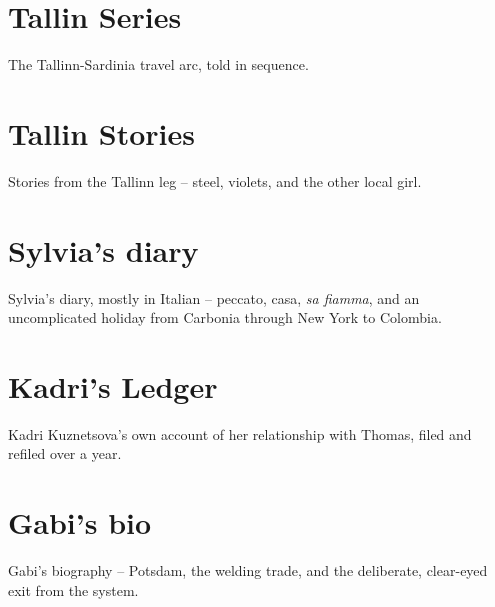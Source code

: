 \documentclass[a4paper]{memoir}
\begin{document}
\chapter{Tallin Series}
The Tallinn-Sardinia travel arc, told in sequence.


\chapter{Tallin Stories}
Stories from the Tallinn leg -- steel, violets, and the other local girl.


\chapter{Sylvia's diary}
Sylvia's diary, mostly in Italian -- peccato, casa, \emph{sa fiamma}, and an uncomplicated holiday from Carbonia through New York to Colombia.


\chapter{Kadri's Ledger}
Kadri Kuznetsova's own account of her relationship with Thomas, filed and refiled over a year.








\chapter{Gabi's bio}
Gabi's biography -- Potsdam, the welding trade, and the deliberate, clear-eyed exit from the system.
\end{document}
